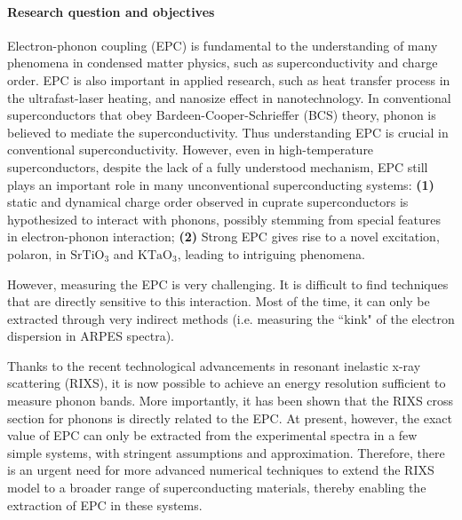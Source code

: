 \documentclass[11pt]{article}
\begin{document}
\paragraph{Research question and objectives}
Electron-phonon coupling (EPC) is fundamental to the understanding of many phenomena in condensed matter physics, such as superconductivity\cite{bardeen_theory_1957,cuk_review_2005} and charge order\cite{arpaia_charge_2021,comin_resonant_2016,tranquada_spins_2013}. EPC is also important in applied research, such as heat transfer process in the ultrafast-laser heating\cite{guo_heat_2012}, and nanosize effect in nanotechnology\cite{zheng_dynamics_2018}.
In conventional superconductors that obey Bardeen-Cooper-Schrieffer (BCS) theory, phonon is believed to mediate the superconductivity\cite{bardeen_theory_1957}. 
Thus understanding EPC is crucial in conventional superconductivity. 
However, even in high-temperature superconductors, despite the lack of a fully understood mechanism, EPC still plays an important role in many unconventional superconducting systems: \textbf{(1)} static and dynamical charge order observed in cuprate superconductors is hypothesized to interact with phonons, possibly stemming from special features in electron-phonon interaction\cite{lin_strongly_2020,wang_charge_2021,huang_quantum_2021,miao_incommensurate_2018,tacon_inelastic_2014,li_multiorbital_2020,chaix_dispersive_2017,braicovich_determining_2020}; 
\textbf{(2)} Strong EPC gives rise to a novel excitation, polaron, in $\mathrm{SrTiO_3}$ and $\mathrm{KTaO_3}$, leading to intriguing phenomena\cite{swartz_polaronic_2018,chen_orientation-dependent_2023}. 

However, measuring the EPC is very challenging. 
It is difficult to find techniques that are directly sensitive to this interaction. Most of the time, it can only be extracted through very indirect methods (i.e. measuring the ``kink" of the electron dispersion in ARPES spectra).

Thanks to the recent technological advancements in resonant inelastic x-ray scattering (RIXS), it is now possible to achieve an energy resolution sufficient to measure phonon bands. 
More importantly, it has been shown that the RIXS cross section for phonons is directly related to the EPC\cite{ament_determining_2011, devereaux_directly_2016}. 
At present, however, the exact value of EPC can only be extracted from the experimental spectra in a few simple systems, with stringent assumptions and approximation\cite{braicovich_determining_2020,vale_high-resolution_2019}. 
Therefore, there is an urgent need for more advanced numerical techniques to extend the RIXS model to a broader range of superconducting materials, thereby enabling the extraction of EPC in these systems. 
\end{document}
